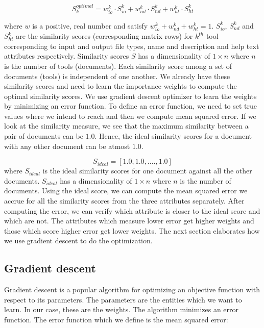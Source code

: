 \begin{equation}
S_k^{optimal} = w^k_{io} \cdot S^k_{io} +  w^k_{nd} \cdot S^k_{nd} + w^k_{ht} \cdot S^k_{ht}
\end{equation}

where $w$ is a positive, real number and satisfy $w^k_{io} + w^k_{nd} + w^k_{ht} = 1$. 
$S^k_{io}$, $S^k_{nd}$ and $S^k_{ht}$ are the similarity scores (corresponding matrix rows) for $k^{th}$ tool corresponding to input and output file types, name and description and help text attributes respectively. Similarity scores $S$ has a dimensionality of $1 \times n$ where $n$ is the number of tools (documents). Each similarity score among a set of documents (tools) is independent of one another. We already have these similarity scores and need to learn the importance weights to compute the optimal similarity scores. We use gradient descent optimizer to learn the weights by minimizing an error function. To define an error function, we need to set true values where we intend to reach and then we compute mean squared error. If we look at the similarity measure, we see that the maximum similarity between a pair of documents can be $1.0$. Hence, the ideal similarity scores for a document with any other document can be atmost $1.0$.

\begin{equation}
S_{ideal} = [ 1.0, 1.0, ...., 1.0 ]
\end{equation}
where $S_{ideal}$ is the ideal similarity scores for one document against all the other documents. $S_{ideal}$ has a dimensionality of $1 \times n$ where $n$ is the number of documents. Using the ideal score, we can compute the mean squared error we accrue for all the similarity scores from the three attributes separately. After computing the error, we can verify which attribute is closer to the ideal score and which are not. The attributes which measure lower error get higher weights and those which score higher error get lower weights. The next section elaborates how we use gradient descent to do the optimization.

\subsection{Gradient descent}
Gradient descent is a popular algorithm for optimizing an objective function with respect to its parameters. The parameters are the entities which we want to learn. In our case, these are the weights. The algorithm minimizes an error function. The error function which we define is the mean squared error:

